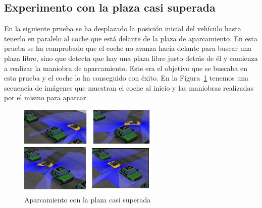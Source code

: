 \subsection{Experimento con la plaza casi superada}
En la siguiente prueba se ha desplazado la posición inicial del vehículo hasta tenerlo en paralelo al coche que está delante de la plaza de aparcamiento. En esta prueba se ha comprobado que el coche no avanza hacia delante para buscar una plaza libre, sino que detecta que hay una plaza libre justo detrás de él y comienza a realizar la maniobra de aparcamiento. Este era el objetivo que se buscaba en esta prueba y el coche lo ha conseguido con éxito. En la Figura~\ref{fig.Experimento2} tenemos una secuencia de imágenes que muestran el coche al inicio y las maniobras realizadas por el mismo para aparcar.

\begin{figure}[H]
  \begin{center}
    \includegraphics[width=0.6\textwidth]{figures/Autopark/Experimento2.png}
		\caption{Aparcamiento con la plaza casi superada}
		\label{fig.Experimento2}
		\end{center}
\end{figure}
